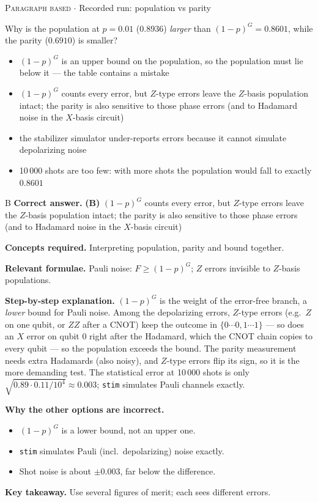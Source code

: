 \documentclass[11pt,a4paper]{article}
\newcommand{\optlabel}[1]{\textbf{(#1)}}
\newcommand{\correctlabel}[1]{\textcolor{okgreen}{\textbf{(#1)}\,\ding{51}}}
\newenvironment{qitem}[1]{\begin{list}{}{\setlength{\leftmargin}{3.3em}\setlength{\labelwidth}{3.1em}%
  \setlength{\labelsep}{0.2em}\setlength{\topsep}{3pt}\setlength{\parsep}{3pt}}\item[\textbf{Q.#1}\hfill]}{\end{list}}
\newcommand{\qsep}{\par\vspace{2pt}{\color{black!15}\hrule}\vspace{4pt}}
\newcommand{\qmeta}[2]{{\footnotesize\color{black!60}\textsc{#1} \;$\cdot$\; #2}\par}
\begin{document}
\begin{qitem}{60}
\qmeta{Paragraph based}{Recorded run: population vs parity}
Why is the population at $p = 0.01$ ($0.8936$) \emph{larger} than $(1 - p)^G = 0.8601$, while the parity ($0.6910$) is smaller?
\begin{itemize}[leftmargin=2.6em, labelsep=0.4em, itemsep=2pt, topsep=3pt]
\item[\optlabel{A}] $(1-p)^G$ is an upper bound on the population, so the population must lie below it --- the table contains a mistake
\item[\correctlabel{B}] $(1-p)^G$ counts every error, but $Z$-type errors leave the $Z$-basis population intact; the parity is also sensitive to those phase errors (and to Hadamard noise in the $X$-basis circuit)
\item[\optlabel{C}] the stabilizer simulator under-reports errors because it cannot simulate depolarizing noise
\item[\optlabel{D}] 10\,000 shots are too few: with more shots the population would fall to exactly $0.8601$
\end{itemize}
\end{qitem}
\begin{solbox}{B}
\textbf{\color{brand}Correct answer.} \textcolor{okgreen}{\textbf{(B)}} $(1-p)^G$ counts every error, but $Z$-type errors leave the $Z$-basis population intact; the parity is also sensitive to those phase errors (and to Hadamard noise in the $X$-basis circuit)

\textbf{\color{brand}Concepts required.} Interpreting population, parity and bound together.

\textbf{\color{brand}Relevant formulae.} Pauli noise: $F \ge (1-p)^G$; $Z$ errors invisible to $Z$-basis populations.

\textbf{\color{brand}Step-by-step explanation.} $(1-p)^G$ is the weight of the error-free branch, a \emph{lower} bound for Pauli noise. Among the depolarizing errors, $Z$-type errors (e.g.\ $Z$ on one qubit, or $ZZ$ after a CNOT) keep the outcome in $\{0\cdots0, 1\cdots1\}$ --- so does an $X$ error on qubit 0 right after the Hadamard, which the CNOT chain copies to every qubit ---
so the population exceeds the bound. The parity measurement
needs extra Hadamards (also noisy), and $Z$-type errors flip its sign, so it is the more demanding test. The statistical error at 10\,000 shots is only
$\sqrt{0.89\cdot0.11/10^4} \approx 0.003$; \texttt{stim} simulates Pauli channels exactly.

\textbf{\color{brand}Why the other options are incorrect.}
\begin{itemize}[leftmargin=2.4em, itemsep=1pt, topsep=2pt]
\item[\textbf{(A)}] $(1-p)^G$ is a lower bound, not an upper one.
\item[\textbf{(C)}] \texttt{stim} simulates Pauli (incl.\ depolarizing) noise exactly.
\item[\textbf{(D)}] Shot noise is about $\pm0.003$, far below the difference.
\end{itemize}
\textbf{\color{brand}Key takeaway.} Use several figures of merit; each sees different errors.
\end{solbox}
\qsep
\end{document}
